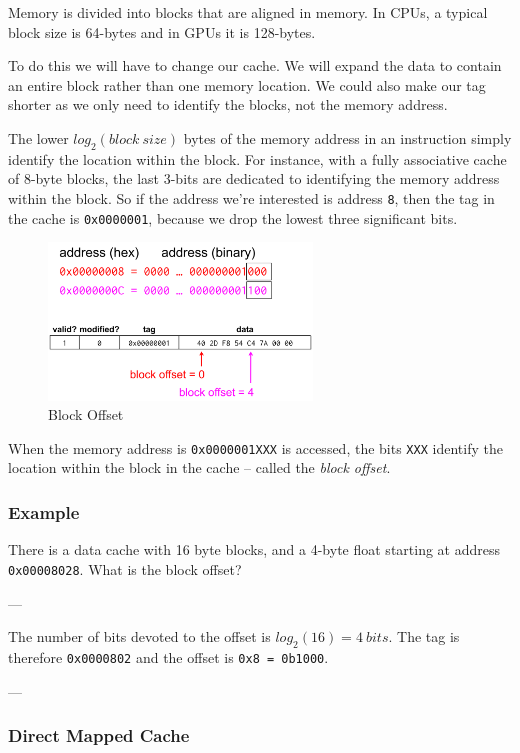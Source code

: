 \documentclass{article}
\begin{document}
Memory is divided into blocks that are aligned in memory. In CPUs, a typical block size is 64-bytes and in GPUs it is 128-bytes. 

To do this we will have to change our cache. We will expand the data to contain an entire block rather than one memory location. We could also make our tag shorter as we only need to identify the blocks, not the memory address. 

The lower $log_2(block\ size)$ bytes of the memory address in an instruction simply identify the location within the block. For instance, with a fully associative cache of 8-byte blocks, the last 3-bits are dedicated to identifying the memory address within the block. So if the address we're interested is address \texttt{8}, then the tag in the cache is \texttt{0x0000001}, because we drop the lowest three significant bits.


\begin{figure}[ht!]
\centering
\includegraphics[width=70mm]{img/BlockOffset.png}
\caption{Block Offset}
\end{figure}

When the memory address is \texttt{0x0000001XXX} is accessed, the bits \texttt{XXX} identify the location within the block in the cache -- called the \textit{block offset}.

\subsubsection*{Example}

There is a data cache with 16 byte blocks, and a 4-byte float starting at address \texttt{0x00008028}. What is the block offset?

---

The number of bits devoted to the offset is $log_2(16) = 4\ bits$. The tag is therefore \texttt{0x0000802} and the offset is \texttt{0x8 = 0b1000}.

---

\subsubsection{Direct Mapped Cache}
\end{document}
